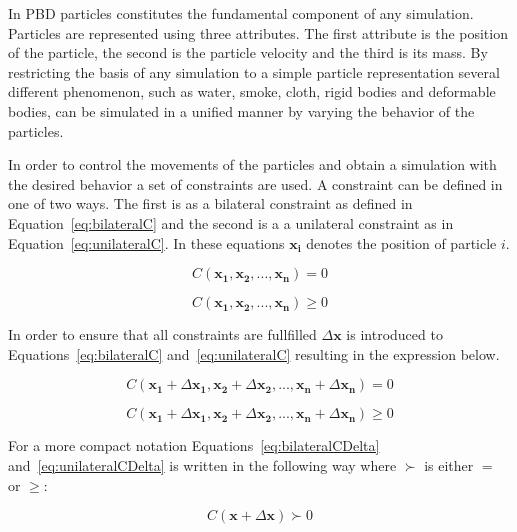 In PBD particles constitutes the fundamental component of any simulation.
Particles are represented using three attributes. The first attribute is the
position of the particle, the second is the particle velocity and the third is
its mass. By restricting the basis of any simulation to a simple particle
representation several different phenomenon, such as water, smoke, cloth, rigid
bodies and deformable bodies, can be simulated in a unified manner by varying
the behavior of the particles.

In order to control the movements of the particles and obtain a simulation with
the desired behavior a set of constraints are used. A constraint can be defined
in one of two ways. The first is as a bilateral constraint as defined in
Equation~\ref{eq:bilateralC} and the second is a a unilateral constraint as in
Equation~\ref{eq:unilateralC}. In these equations $ \mathbf{x_{i}} $ denotes
the position of particle $ i $.

\begin{equation}
\label{eq:bilateralC}
C(\mathbf{x_{1}}, \mathbf{x_{2}}, ..., \mathbf{x_{n}}) = 0
\end{equation}

\begin{equation}
\label{eq:unilateralC}
C(\mathbf{x_{1}}, \mathbf{x_{2}}, ..., \mathbf{x_{n}}) \geq 0
\end{equation}

In order to ensure that all constraints are fullfilled $ \Delta \mathbf{x} $ is
introduced to Equations~\ref{eq:bilateralC} and~\ref{eq:unilateralC} resulting
in the expression below.

\begin{equation}
\label{eq:bilateralCDelta}
C(\mathbf{x_{1}} + \Delta \mathbf{x_{1}}, \mathbf{x_{2}} + \Delta \mathbf{x_{2}}, ..., \mathbf{x_{n}} + \Delta \mathbf{x_{n}}) = 0
\end{equation}

\begin{equation}
\label{eq:unilateralCDelta}
C(\mathbf{x_{1}} + \Delta \mathbf{x_{1}}, \mathbf{x_{2}} + \Delta \mathbf{x_{2}}, ..., \mathbf{x_{n}} + \Delta \mathbf{x_{n}}) \geq 0
\end{equation}

For a more compact notation Equations~\ref{eq:bilateralCDelta}
and~\ref{eq:unilateralCDelta} is written in the following way
where $ \succ $ is either $ = $ or $ \geq $:

\begin{equation}
\label{eq:cCombined}
C(\mathbf{x} + \Delta \mathbf{x}) \succ 0
\end{equation}

